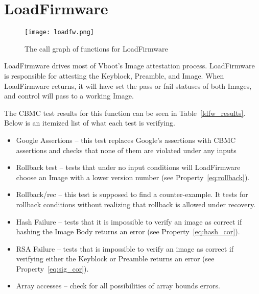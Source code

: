 \section{LoadFirmware}

\begin{figure}[!htbp]
  \centering
  \texttt{[image: loadfw.png]}
  \caption[LoadFirmware Call Graph]{The call graph of functions for LoadFirmware}\label{fig:loadfw}
\end{figure}

LoadFirmware drives most of Vboot's Image attestation process.
LoadFirmware is responsible for attesting the Keyblock, Preamble, and Image.
When LoadFirmware returns, it will have set the pass or fail statuses of both Images, and control will pass to a working Image.

The CBMC test results for this function can be seen in Table~\ref{ldfw_results}. 
Below is an itemized list of what each test is verifying.

\begin{itemize}
 \item  Google Assertions -- this test replaces Google's assertions with CBMC assertions and checks that none of them are violated under any inputs
 \item  Rollback test -- tests that under no input conditions will LoadFirmware choose an Image with a lower version number (see Property~\ref{eq:rollback}).
 \item  Rollback/rec  -- this test is supposed to find a counter-example. It tests for rollback conditions without realizing that rollback is allowed under recovery. 
 \item  Hash Failure -- tests that it is impossible to verify an image as correct if hashing the Image Body returns an error (see Property~\ref{eq:hash_cor}).
 \item  RSA Failure -- tests that is impossible to verify an image as correct if verifying either the Keyblock or Preamble returns an error (see Property~\ref{eq:sig_cor}).
 \item  Array accesses -- check for all possibilities of array bounds errors.
\end{itemize}

